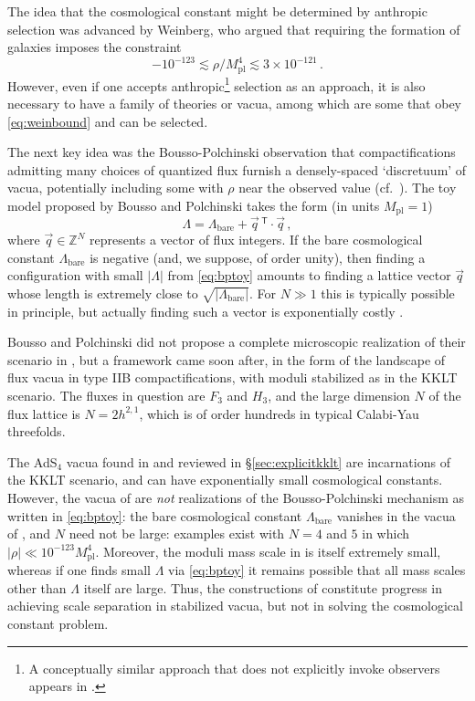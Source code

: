 \documentclass[12pt,a4wide]{article}
\begin{document}
The idea that the cosmological constant might be determined by anthropic selection was
advanced by Weinberg, who argued that requiring the formation of galaxies imposes the constraint \cite{Weinberg:1987dv}
\begin{equation}\label{eq:weinbound}
-10^{-123}\lesssim \rho/M_{\text{pl}}^4 \lesssim 3\times 10^{-121}\,.
\end{equation}
However, even if one accepts anthropic\footnote{A conceptually similar approach that does not explicitly invoke observers appears in \cite{Bousso:2007kq}.} selection as an approach, it is also necessary to have a family of theories or vacua, among which are some that obey \eqref{eq:weinbound} and can be selected. 

The next key idea
was the Bousso-Polchinski
\cite{Bousso:2000xa} observation that 
compactifications admitting many choices of quantized flux furnish a densely-spaced `discretuum' of vacua, potentially including some with $\rho$ near the observed value (cf.~\cite{Feng:2000if}).
The toy model proposed by Bousso and Polchinski takes the form (in units $M_{\text{pl}}=1$)
\begin{equation}\label{eq:bptoy}
    \Lambda =  \Lambda_{\text{bare}} + \vec{q}\,^{\mathsf{T}}\cdot\vec{q}\,,
\end{equation} where $\vec{q} \in \mathbb{Z}^N$ represents a vector of flux integers. 
If the bare cosmological constant $\Lambda_{\text{bare}}$ is negative (and, we suppose, of order unity), then finding a configuration with small $|\Lambda|$ from \eqref{eq:bptoy} amounts to finding a lattice vector $\vec{q}$ whose length is extremely close to $\sqrt{|\Lambda_{\text{bare}}|}$.
For $N \gg 1$ this is typically possible in principle, but actually finding such a vector is exponentially costly \cite{Denef:2006ad}.
 
Bousso and Polchinski did not propose a complete microscopic realization of their scenario
in \cite{Bousso:2000xa}, but a framework came soon after, in the form of
the landscape of flux vacua in type IIB compactifications, with moduli stabilized as in 
the KKLT scenario.  The fluxes in question are $F_3$ and $H_3$, and the large dimension $N$ of the flux lattice is $N=2h^{2,1}$, which is of order hundreds in typical Calabi-Yau threefolds.

The AdS$_4$ vacua found in \cite{Demirtas:2021nlu} and reviewed in \S\ref{sec:explicitkklt} are incarnations of the KKLT scenario, and can have exponentially small cosmological constants.
However, the vacua of 
\cite{Demirtas:2021nlu} are \emph{not} realizations of the Bousso-Polchinski mechanism as written in \eqref{eq:bptoy}: the bare cosmological constant $\Lambda_{\text{bare}}$ vanishes in the vacua of \cite{Demirtas:2021nlu}, and $N$ need not be large: examples exist with $N=4$ and $5$ in which $|\rho| \ll  10^{-123} M_{\text{pl}}^4$.  Moreover, the moduli mass scale in \cite{Demirtas:2021nlu} is itself extremely small, whereas if one finds small $\Lambda$ via \eqref{eq:bptoy} it remains possible that all mass scales other than $\Lambda$ itself are large.  Thus, the constructions of 
\cite{Demirtas:2021nlu} constitute progress in achieving scale separation in stabilized vacua, but not in solving the cosmological constant problem.
 
\end{document}
